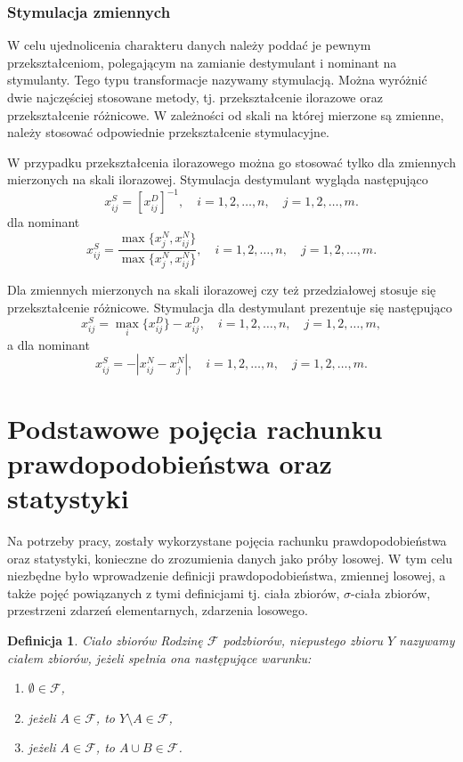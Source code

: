\documentclass[12pt,a4paper]{report}
\newtheorem{definition}[theorem]{Definicja}
\begin{document}
\subsubsection{Stymulacja zmiennych}
W celu ujednolicenia charakteru danych należy poddać je pewnym przekształceniom, polegającym na zamianie destymulant i nominant na stymulanty. Tego typu transformacje nazywamy stymulacją. Można wyróżnić dwie najczęściej stosowane metody, tj. przekształcenie ilorazowe oraz przekształcenie różnicowe. W zależności od skali na której mierzone są zmienne, należy stosować odpowiednie przekształcenie stymulacyjne.

W przypadku przekształcenia ilorazowego można go stosować tylko dla zmiennych mierzonych na skali ilorazowej. Stymulacja destymulant wygląda następująco
$$
x_{ij}^{S}=[x_{ij}^{D}]^{-1},  \quad i = 1,2, \ldots, n, \quad j=1,2,\ldots, m.
$$
dla nominant
$$
x_{ij}^{S}=\frac{\max\{x_{j}^{N},x_{ij}^{N}\}}{\max\{x_{j}^{N},x_{ij}^{N}\}}, \quad i = 1,2, \ldots, n, \quad j=1,2,\ldots, m.
$$

Dla zmiennych mierzonych na skali ilorazowej czy też przedziałowej stosuje się przekształcenie różnicowe. Stymulacja dla destymulant prezentuje się następująco
$$
x_{ij}^{S}=\max\limits_{i} \{x_{ij}^{D}\} - x_{ij}^{D}, \quad i = 1,2, \ldots, n, \quad j=1,2,\ldots, m,
$$
a dla nominant
$$
x_{ij}^{S}=-|x_{ij}^{N}-x_{j}^{N}|, \quad i = 1,2, \ldots, n, \quad j=1,2,\ldots, m.
$$





\section{Podstawowe pojęcia rachunku prawdopodobieństwa oraz statystyki} \label{rachunek prawdopodobienstwa}


Na potrzeby pracy, zostały wykorzystane pojęcia rachunku prawdopodobieństwa oraz statystyki, konieczne do zrozumienia danych jako próby losowej. W tym celu niezbędne było wprowadzenie definicji prawdopodobieństwa, zmiennej losowej, a także pojęć powiązanych z tymi definicjami tj. ciała zbiorów, $\sigma$-ciała zbiorów, przestrzeni zdarzeń elementarnych, zdarzenia losowego.


\begin{definition}{Ciało zbiorów \cite[Rozdział 8.1]{rudnicki2006}}
Rodzinę $\mathcal{F}$ podzbiorów, niepustego zbioru $Y$ nazywamy ciałem zbiorów, jeżeli spełnia ona następujące warunku: 
\begin{enumerate}
\item $\emptyset \in \mathcal{F}$,
\item jeżeli $A \in \mathcal{F}$, to $Y \setminus A \in \mathcal{F}$,
\item jeżeli $A \in \mathcal{F}$, to $A \cup B \in \mathcal{F}$.
\end{enumerate}
\end{definition}
\end{document}
